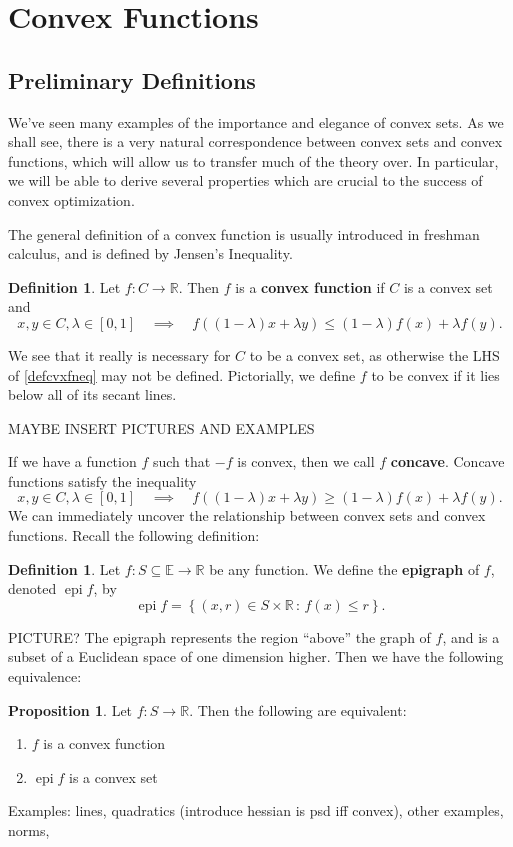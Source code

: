 \documentclass[11pt]{article}
\numberwithin{equation}{section}
\theoremstyle{definition}
\newtheorem{proposition}[theorem]{Proposition}
\newtheorem{definition}[theorem]{Definition}%
\newcommand{\bE}{\mathbb{E}}
\newcommand{\bR}{\mathbb{R}}
\newcommand{\set}[2]{\left\{#1\,:\,#2\right\}}
\newcommand{\epi}{\operatorname{epi}}
\begin{document}
\section{Convex Functions}
\subsection{Preliminary Definitions}
We've seen many examples of the importance and elegance of convex sets. As we shall see, there is a very natural correspondence between convex sets and convex functions, which will allow us to transfer much of the theory over. In particular, we will be able to derive several properties which are crucial to the success of convex optimization.

The general definition of a convex function is usually introduced in freshman calculus, and is defined by Jensen's Inequality.
\begin{definition}
    Let $f:C\to\bR$. Then $f$ is a \textbf{convex function} if $C$ is a convex set and
    \begin{equation}
        \label{defcvxfneq}
        x, y\in C, \lambda\in[0, 1]\quad\implies\quad f((1-\lambda)x+\lambda y)\le (1-\lambda)f(x)+\lambda f(y).
    \end{equation}
\end{definition}
We see that it really is necessary for $C$ to be a convex set, as otherwise the LHS of \ref{defcvxfneq} may not be defined. Pictorially, we define $f$ to be convex if it lies below all of its secant lines.

MAYBE INSERT PICTURES AND EXAMPLES

If we have a function $f$ such that $-f$ is convex, then we call $f$ \textbf{concave}. Concave functions satisfy the inequality
    \begin{equation}
        \label{defccvfneq}
        x, y\in C, \lambda\in[0, 1]\quad\implies\quad f((1-\lambda)x+\lambda y)\ge (1-\lambda)f(x)+\lambda f(y).
    \end{equation}
We can immediately uncover the relationship between convex sets and convex functions. Recall the following definition:
\begin{definition}
    Let $f:S\subseteq\bE\to\bR$ be any function. We define the \textbf{epigraph} of $f$, denoted $\epi f$, by
    \begin{equation}
        \epi f=\set{(x, r)\in S\times\bR}{f(x)\le r}.
    \end{equation}
\end{definition}
PICTURE? The epigraph represents the region ``above'' the graph of $f$, and is a subset of a Euclidean space of one dimension higher. Then we have the following equivalence:
\begin{proposition}
    Let $f:S\to\bR$. Then the following are equivalent:
    \begin{enumerate}[label=(\roman*)]
        \item $f$ is a convex function
        \item $\epi f$ is a convex set
    \end{enumerate}
\end{proposition}
Examples: lines, quadratics (introduce hessian is psd iff convex), other examples, norms,
\end{document}
